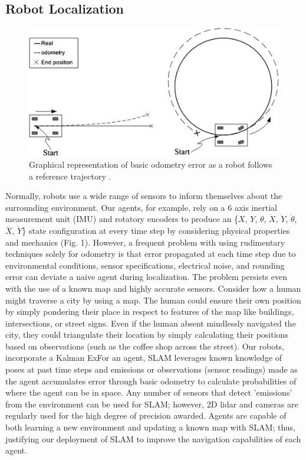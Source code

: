 \documentclass[conference]{IEEEtran}
\begin{document}
\subsection{Robot Localization}
\begin{figure}
	\includegraphics[width=\linewidth]{odometry_error.jpg}
	\caption{Graphical representation of basic odometry error as a robot follows a reference trajectory \cite{RN206}.}
\end{figure}
Normally, robots use a wide range of sensors to inform themselves about the surrounding environment. Our agents, for example, rely on a 6 axis inertial measurement unit (IMU) and rotatory encoders to produce an \{$X$, $Y$, $\theta$, $\dot{X}$, $\dot{Y}$, $\dot{\theta}$, $\ddot{X}$, $\ddot{Y}$\} state configuration at every time step by considering physical properties and mechanics (Fig. 1). However, a frequent problem with using rudimentary techniques solely for odometry is that error propagated at each time step due to environmental conditions, sensor specifications, electrical noise, and rounding error can deviate a naive agent during localization. The problem persists even with the use of a known map and highly accurate sensors. Consider how a human might traverse a city by using a map. The human could ensure their own position by simply pondering their place in respect to features of the map like buildings, intersections, or street signs. Even if the human absent mindlessly navigated the city, they could triangulate their location by simply calculating their positions based on observations (such as the coffee shop across the street). Our robots, incorporate a Kalman ExFor an agent, SLAM leverages known knowledge of poses at past time steps and emissions or observations (sensor readings) made as the agent accumulates error through basic odometry to calculate probabilities of where the agent can be in space. Any number of sensors that detect 'emissions' from the environment can be used for SLAM; however, 2D lidar and cameras are regularly used for the high degree of precision awarded. Agents are capable of both learning a new environment and updating a known map with SLAM; thus, justifying our deployment of SLAM to improve the navigation capabilities of each agent.
\end{document}
